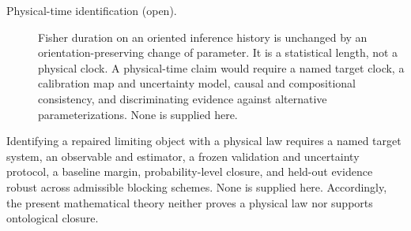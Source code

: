 \begin{description}
\item[Physical-time identification (open).]
Fisher duration on an oriented inference history is unchanged by an
orientation-preserving change of parameter.  It is a statistical length, not
a physical clock.  A physical-time claim would require a named target clock,
a calibration map and uncertainty model, causal and compositional consistency,
and discriminating evidence against alternative parameterizations.  None is
supplied here. 
\end{description}

Identifying a repaired limiting object with a physical law requires a named
target system, an observable and estimator, a frozen validation and
uncertainty protocol, a baseline margin, probability-level closure, and
held-out evidence robust across admissible blocking schemes.  None is
supplied here.  Accordingly, the present mathematical theory neither proves
a physical law nor supports ontological closure. 

\normalsize
